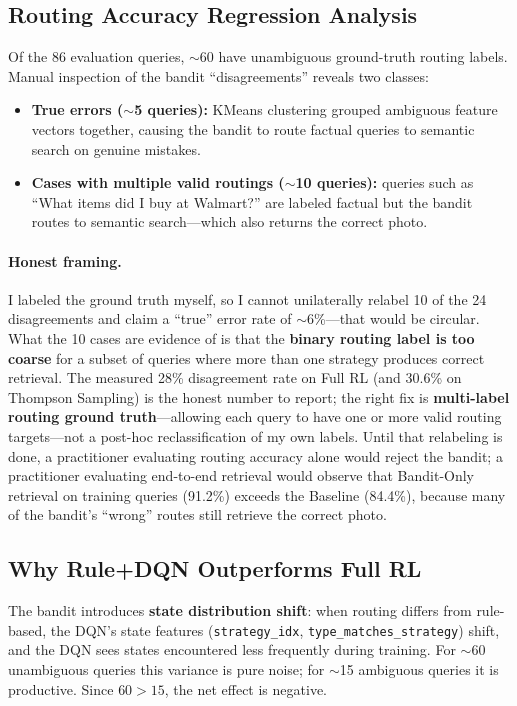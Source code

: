 \documentclass[11pt,letterpaper]{article}
\begin{document}
\subsection{Routing Accuracy Regression Analysis}

Of the 86 evaluation queries, $\sim$60 have unambiguous ground-truth routing labels. Manual inspection of the bandit ``disagreements'' reveals two classes:
\begin{itemize}[nosep]
  \item \textbf{True errors ($\sim$5 queries):} KMeans clustering grouped ambiguous feature vectors together, causing the bandit to route factual queries to semantic search on genuine mistakes.
  \item \textbf{Cases with multiple valid routings ($\sim$10 queries):} queries such as ``What items did I buy at Walmart?'' are labeled factual but the bandit routes to semantic search---which also returns the correct photo.
\end{itemize}

\paragraph{Honest framing.} I labeled the ground truth myself, so I cannot unilaterally relabel 10 of the 24 disagreements and claim a ``true'' error rate of $\sim$6\%---that would be circular. What the 10 cases are evidence of is that the \textbf{binary routing label is too coarse} for a subset of queries where more than one strategy produces correct retrieval. The measured 28\% disagreement rate on Full RL (and 30.6\% on Thompson Sampling) is the honest number to report; the right fix is \textbf{multi-label routing ground truth}---allowing each query to have one or more valid routing targets---not a post-hoc reclassification of my own labels. Until that relabeling is done, a practitioner evaluating routing accuracy alone would reject the bandit; a practitioner evaluating end-to-end retrieval would observe that Bandit-Only retrieval on training queries (91.2\%) exceeds the Baseline (84.4\%), because many of the bandit's ``wrong'' routes still retrieve the correct photo.

\subsection{Why Rule+DQN Outperforms Full RL}

The bandit introduces \textbf{state distribution shift}: when routing differs from rule-based, the DQN's state features (\texttt{strategy\_idx}, \texttt{type\_matches\_strategy}) shift, and the DQN sees states encountered less frequently during training. For $\sim$60 unambiguous queries this variance is pure noise; for $\sim$15 ambiguous queries it is productive. Since $60 > 15$, the net effect is negative.
\end{document}
